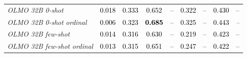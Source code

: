 \begin{table}[!htbp]
{\begin{tabular}{lcccccccc}
\textit{OLMO 32B 0-shot} & \textcolor{black}{0.018} & \textcolor{black}{0.333} & \textcolor{black}{0.652} & \textcolor{black}{--} & \textcolor{black}{0.322} & \textcolor{black}{--} & \textcolor{black}{0.430} & \textcolor{black}{--} \\
\textit{OLMO 32B 0-shot ordinal} & \textcolor{black}{0.006} & \textcolor{black}{0.323} & \textcolor{black}{\textbf{0.685}} & \textcolor{black}{--} & \textcolor{black}{0.325} & \textcolor{black}{--} & \textcolor{black}{0.443} & \textit{--} \\
\textit{OLMO 32B few-shot} & \textcolor{black}{0.014} & \textcolor{black}{0.316} & \textcolor{black}{0.630} & \textcolor{black}{--} & \textcolor{black}{0.219} & \textcolor{black}{--} & \textcolor{black}{0.423} & \textcolor{black}{--} \\
\textit{OLMO 32B few-shot ordinal} & \textcolor{black}{0.013} & \textcolor{black}{0.315} & \textcolor{black}{0.651} & \textcolor{black}{--} & \textcolor{black}{0.247} & \textcolor{black}{--} & \textcolor{black}{0.422} & \textcolor{black}{--} \\


\end{tabular}}
\end{table}
